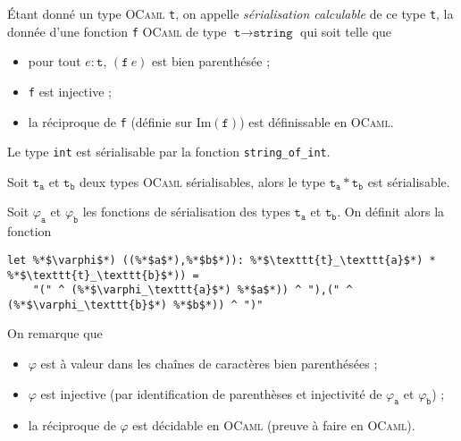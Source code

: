 \begin{defn}
	Étant donné un type \textsc{OCaml} \texttt{t}, on appelle \textit{sérialisation calculable} de ce type \texttt{t}, la donnée d'une fonction \texttt{f} \textsc{OCaml} de type $\texttt{t}\to \texttt{string}$\/ qui soit telle que
	\begin{itemize}
		\item pour tout $e : \texttt{t}$, $(\texttt{f}\ e)$\/ est bien parenthésée ;
		\item \texttt{f} est injective ;
		\item la réciproque de \texttt{f} (définie sur $\mathrm{Im}(\mathtt{f})$) est définissable en \textsc{OCaml}.
	\end{itemize}
\end{defn}

\begin{exm}
	Le type \texttt{int} est sérialisable par la fonction \verb|string_of_int|.
\end{exm}

\begin{prop}
	Soit $\texttt{t}_\texttt{a}$\/ et $\texttt{t}_\texttt{b}$\/ deux types \textsc{OCaml} sérialisables, alors le type $\texttt{t}_\texttt{a} * \texttt{t}_\texttt{b}$ est sérialisable.
\end{prop}

\begin{prv}
	Soit $\varphi_\texttt{a}$\/ et $\varphi_\texttt{b}$\/ les fonctions de sérialisation des types $\texttt{t}_\texttt{a}$\/ et $\texttt{t}_\texttt{b}$. On définit alors la fonction
		\begin{lstlisting}[language=caml,caption=Fonction \textsc{OCaml} sérialisant le produit cartésien de deux types sérialisables]
let %*$\varphi$*) ((%*$a$*),%*$b$*)): %*$\texttt{t}_\texttt{a}$*) * %*$\texttt{t}_\texttt{b}$*)) =
	"(" ^ (%*$\varphi_\texttt{a}$*) %*$a$*)) ^ "),(" ^ (%*$\varphi_\texttt{b}$*) %*$b$*)) ^ ")"
	\end{lstlisting}
	On remarque que
	\begin{itemize}
		\item $\varphi$\/ est à valeur dans les chaînes de caractères bien parenthésées ;
		\item $\varphi$\/ est injective (par identification de parenthèses et injectivité de $\varphi_\texttt{a}$\/ et $\varphi_\texttt{b}$) ;
		\item la réciproque de $\varphi$\/ est décidable en \textsc{OCaml} (preuve à faire en \textsc{OCaml}).
	\end{itemize}
\end{prv}

